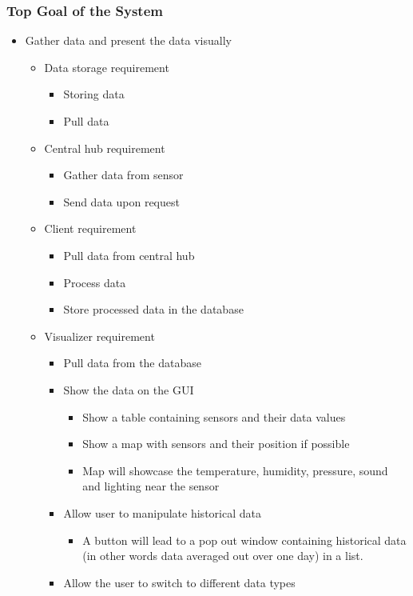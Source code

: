 \documentclass[../document]{subfiles}
\begin{document}
\subsubsection{Top Goal of the System}
\begin{itemize}
	\item
	Gather data and present the data visually
	\begin{itemize}
		\item
		Data storage requirement
		\begin{itemize}
			\item
			Storing data
			\item
			Pull data
		\end{itemize}
		\item
		Central hub requirement
		\begin{itemize}
			\item
			Gather data from sensor
			\item
			Send data upon request
		\end{itemize}
		\item
		Client requirement
		\begin{itemize}
			\item
			Pull data from central hub
			\item
			Process data
			\item
			Store processed data in the database
		\end{itemize}
		\item
		Visualizer requirement
		\begin{itemize}
			\item
			Pull data from the database
			\item
			Show the data on the GUI
			\begin{itemize}
				\item
				Show a table containing sensors and their data values
				\item
				Show a map with sensors and their position if possible
				\item
				Map will showcase the temperature, humidity, pressure, sound and lighting near the sensor
			\end{itemize}
			\item
			Allow user to manipulate historical data
			\begin{itemize}
				\item
				A button will lead to a pop out window containing historical data (in other words data averaged out over one day) in a list.
			\end{itemize}
			\item
			Allow the user to switch to different data types
		\end{itemize}
	\end{itemize}
\end{itemize}
\end{document}
